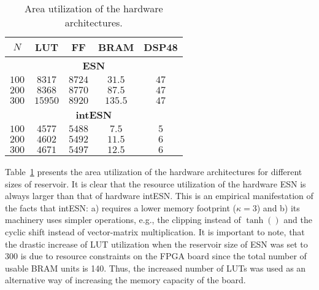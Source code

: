 \begin{table}[tb]%
\renewcommand{\arraystretch}{1.3}
\caption{Area utilization of the hardware architectures.
\label{tab:fpga:resources}
\vspace{-2mm}}
    \begin{center}
    \begin{tabular}{|c|c|c|c|c|}\hline
        $N$ & \textbf{LUT} & \textbf{FF} & \textbf{BRAM} & \textbf{DSP48} \\ \hline \hline 
      	\multicolumn{5}{|c|}{\textbf{ESN}} \\ \hline\hline
        $100$	& $8317$	& 	$8724$ &	$31.5$ &	$47$ \\ \hline  
 	$200$ & $8368 $	& 	$8770 $ &	$87.5$ &	$47$	 \\ \hline
	$300$ 		& $15950 $	& 	$8920 $ &	$135.5$ &	$47$\\ \hline \hline   	    
        \multicolumn{5}{|c|}{\textbf{intESN}} \\ \hline\hline
	 $100$ &	$4577 $	& 	$5488 $ &	$7.5 $ &	$5 $	  \\\hline
	 $200$ 	 & $4602 $	& 	$5492 $ &	$11.5 $ &	$6 $	  \\\hline
        $300$	& $4671 $	& 	$5497 $ &	$12.5 $ &	$6 $	 \\ \hline    	
    \end{tabular}
    \end{center}
\end{table}


Table~\ref{tab:fpga:resources} presents the area utilization of the hardware architectures for different sizes of reservoir.
It is clear that the resource utilization of the hardware ESN is always larger than that of hardware intESN. 
This is an empirical manifestation of the facts that intESN: a) requires a lower memory footprint ($\kappa=3$) and b) its machinery uses simpler operations, e.g., the clipping instead of $\tanh()$ and the cyclic shift instead of vector-matrix multiplication. 
It is important to note, that the drastic increase of LUT utilization when the reservoir size of ESN was set to $300$ is due to resource constraints on the FPGA board since the total number of usable BRAM units is 140.
Thus, the increased number of LUTs was used as an alternative way of increasing the memory capacity of the board.



